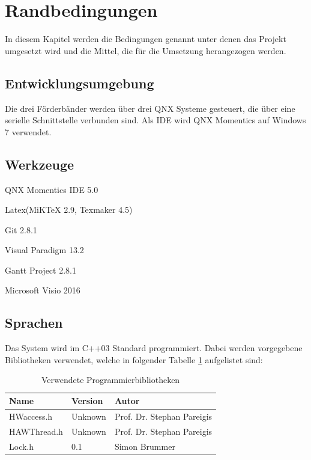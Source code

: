 \documentclass[a4paper, 11pt]{article}
\begin{document}
\section{Randbedingungen}
In diesem Kapitel werden die Bedingungen genannt unter denen das Projekt umgesetzt wird und die Mittel, die für die Umsetzung herangezogen werden.

\subsection{Entwicklungsumgebung}
Die drei Förderbänder werden über drei QNX Systeme gesteuert, die über eine serielle Schnittstelle verbunden sind. Als IDE wird QNX Momentics auf Windows 7 verwendet.

\subsection{Werkzeuge}
\begin{compactenum}[-]
\item QNX Momentics IDE 5.0
\item Latex(MiKTeX 2.9, Texmaker 4.5)
\item Git 2.8.1
\item Visual Paradigm 13.2
\item Gantt Project 2.8.1
\item Microsoft Visio 2016
\end{compactenum}

\subsection{Sprachen}
Das System wird im C++03 Standard programmiert. Dabei werden vorgegebene Bibliotheken verwendet, welche in folgender Tabelle \ref{bibl} aufgelistet sind:
\medskip
\begin{table}[h]
\center
\begin{tabular}{|l|l|l|}
\hline
\textbf{Name}&\textbf{Version}&\textbf{Autor}\\
\hline
HWaccess.h&Unknown&Prof. Dr. Stephan Pareigis\\
\hline
HAWThread.h&Unknown&Prof. Dr. Stephan Pareigis \\
\hline
Lock.h&0.1&Simon Brummer \\
\hline
\end{tabular}
\caption{Verwendete Programmierbibliotheken}
\label{bibl}
\end{table}

\newpage
\end{document}
